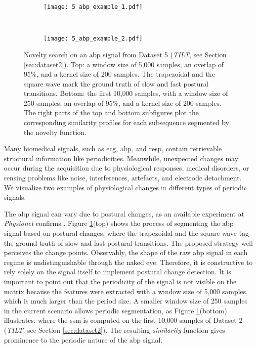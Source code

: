 \begin{figure}
    \centering
    \begin{subfigure}[b]{\textwidth}
         \centering
         \texttt{[image: 5\_abp\_example\_1.pdf]}
    \end{subfigure}\\
    \vspace{5mm}
    \begin{subfigure}[b]{\textwidth}
         \centering
         \texttt{[image: 5\_abp\_example\_2.pdf]}
    \end{subfigure}
    \caption{Novelty search on an \gls{abp} signal from Dataset 5 (\textit{TILT}, see Section \ref{sec:dataset2}). Top: a window size of 5,000 samples, an overlap of 95\%, and a kernel size of 200 samples. The trapezoidal and the square wave mark the ground truth of slow and fast postural transitions. Bottom: the first 10,000 samples, with a window size of 250 samples, an overlap of 95\%, and a kernel size of 200 samples. The right parts of the top and bottom subfigures plot the corresponding similarity profiles for each subsequence segmented by the novelty function.}
    \label{fig:use_case2}
\end{figure}

Many biomedical signals, such as \gls{ecg}, \gls{abp}, and \gls{resp}, contain retrievable structural information like periodicities. Meanwhile, unexpected changes may occur during the acquisition due to physiological responses, medical disorders, or sensing problems like noise, interferences, artefacts, and electrode detachment. We visualize two examples of physiological changes in different types of periodic signals.

The \gls{abp} signal can vary due to postural changes, as an available experiment at \textit{Physionet} confirms \cite{tilt, PhBank}. Figure \ref{fig:use_case2}(top) shows the process of segmenting the \gls{abp} signal based on postural changes, where the trapezoidal and the square wave tag the ground truth of slow and fast postural transitions. The proposed strategy well perceives the change points. Observably, the shape of the raw \gls{abp} signal in each regime is undistinguishable through the naked eye. Therefore, it is constructive to rely solely on the signal itself to implement postural change detection. It is important to point out that the periodicity of the signal is not visible on the matrix because the features were extracted with a window size of 5,000 samples, which is much larger than the period size. A smaller window size of 250 samples in the current scenario allows periodic segmentation, as Figure \ref{fig:use_case2}(bottom) illustrates, where the \gls{ssm} is computed on the first 10,000 samples of Dataset 2 (\textit{TILT}, see Section \ref{sec:dataset2}).
The resulting \textit{similarity} function gives prominence to the periodic nature of the \gls{abp} signal.

